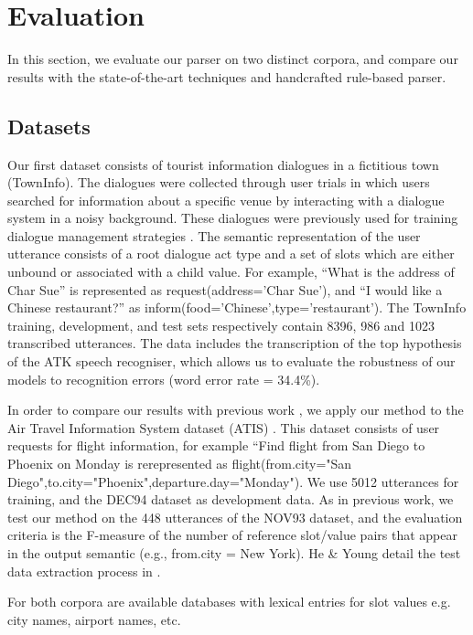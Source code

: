 \documentclass[11pt]{article}
\begin{document}
\section{Evaluation}

In this section, we evaluate our parser on two distinct corpora, and compare our results with the state-of-the-art techniques and handcrafted rule-based parser. 

\subsection{Datasets}

Our first dataset consists of tourist information dialogues in a fictitious
town (TownInfo). The dialogues were collected through user
trials in which users searched for information about a specific venue
by interacting with a dialogue system in a noisy background. These
dialogues were previously used for training dialogue management
strategies \cite{williams07,thomson08}. The semantic representation of the user utterance consists of a root dialogue act type and a set of slots which are either
unbound or associated with a child value. For example, ``What is
the address of Char Sue'' is represented as request(address='Char Sue'), and ``I would like a Chinese restaurant?'' as inform(food='Chinese',type='restaurant'). The TownInfo training, development, and test sets respectively contain
8396, 986 and 1023 transcribed utterances.  The data includes the transcription of the top hypothesis of the ATK speech recogniser,
which allows us to evaluate the robustness of our models to recognition
errors (word error rate = 34.4\%). 

In order to compare our results with previous work \cite{he06,zettlemoyer07},
we apply our method to the Air Travel Information System dataset
(ATIS) \cite{atis94}. This dataset consists of user requests for flight information, for example ``Find flight from San Diego to Phoenix on Monday is rerepresented as flight(from.city="San Diego",to.city="Phoenix",departure.day="Monday"). We use 5012 utterances for training, and the DEC94 dataset as development data. As in previous work, we test our method on the 448 utterances of the NOV93 dataset, and the evaluation criteria is the F-measure of the number of reference slot/value pairs that appear in the output semantic (e.g., from.city = New York). He \& Young detail the test data extraction process in \cite{he05}.

For both corpora are available databases with lexical entries for slot values e.g. city names, airport names, etc. 
\end{document}
